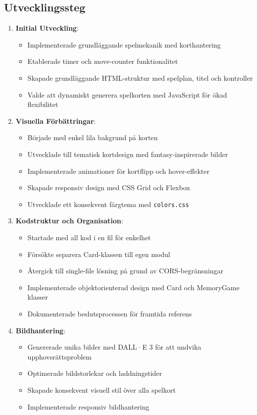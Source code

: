 \documentclass[a4paper,12pt]{article}
\begin{document}
\subsection*{Utvecklingssteg}
\begin{enumerate}
    \item \textbf{Initial Utveckling}:
    \begin{itemize}
        \item Implementerade grundläggande spelmekanik med korthantering
        \item Etablerade timer och move-counter funktionalitet
        \item Skapade grundläggande HTML-struktur med spelplan, titel och kontroller
        \item Valde att dynamiskt generera spelkorten med JavaScript för ökad flexibilitet
    \end{itemize}

    \item \textbf{Visuella Förbättringar}:
    \begin{itemize}
        \item Började med enkel lila bakgrund på korten
        \item Utvecklade till tematisk kortdesign med fantasy-inspirerade bilder
        \item Implementerade animationer för kortflipp och hover-effekter
        \item Skapade responsiv design med CSS Grid och Flexbox
        \item Utvecklade ett konsekvent färgtema med \texttt{colors.css}
    \end{itemize}

    \item \textbf{Kodstruktur och Organisation}:
    \begin{itemize}
        \item Startade med all kod i en fil för enkelhet
        \item Försökte separera Card-klassen till egen modul
        \item Återgick till single-file lösning på grund av CORS-begränsningar
        \item Implementerade objektorienterad design med Card och MemoryGame klasser
        \item Dokumenterade beslutsprocessen för framtida referens
    \end{itemize}

    \item \textbf{Bildhantering}:
    \begin{itemize}
        \item Genererade unika bilder med DALL·E 3 för att undvika upphovsrättsproblem
        \item Optimerade bildstorlekar och laddningstider
        \item Skapade konsekvent visuell stil över alla spelkort
        \item Implementerade responsiv bildhantering
    \end{itemize}


\end{enumerate}
\end{document}
